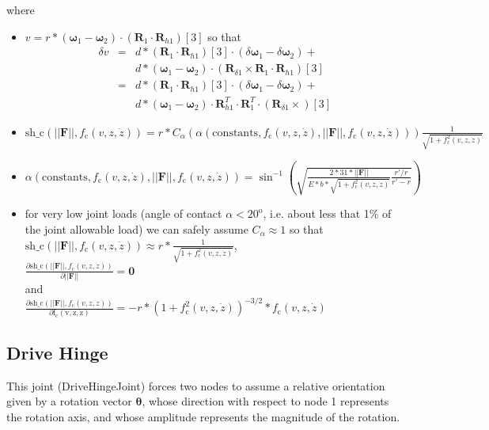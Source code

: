 \documentclass[10pt,dvips,fleqn]{report}
\newcommand{\T}[1]{\boldsymbol{#1}}
\begin{document}
where
\begin{itemize}
\item
$v=r * (\T \omega_{1}-\T \omega_{2})\cdot(\T R_1\cdot \T R_{h1})[3]$
so that
\begin{eqnarray*}
\delta v &=& d * (\T R_1\cdot \T R_{h1})[3] \cdot (\delta \T \omega_{1}- \delta \T \omega_{2}) +\\
	&& d * (\T \omega_{1}-\T \omega_{2})\cdot (\T R_{\delta 1} \times \T R_1 \cdot \T R_{h1})[3]\\
	&=& d * (\T R_1\cdot \T R_{h1})[3] \cdot (\delta \T \omega_{1}- \delta \T \omega_{2}) +\\
	&& d * (\T \omega_{1}-\T \omega_{2})\cdot \T R_{h1}^T \cdot \T R_1^T \cdot (\T R_{\delta 1} \times )[3]
\end{eqnarray*}
\item
$
\mathrm{sh\_c}(||\T F||, f_{\mathrm{c}}(v,z,\dot{z}))=
r * 
C_\alpha(
	\alpha(\mathrm{constants},
		f_{\mathrm{c}}(v,z,\dot{z}),
		||\T F||,
		f_{\mathrm{c}}(v,z,\dot{z})
	)
) 
\frac{\displaystyle 1}{\displaystyle \sqrt{1+f_{\mathrm{c}}^2(v,z,\dot{z})}}
$
\item
$
\alpha(\mathrm{constants},
	f_{\mathrm{c}}(v,z,\dot{z}),
	||\T F||,
	f_{\mathrm{c}}(v,z,\dot{z})
) =
\sin^{-1}\left(
	\sqrt{
		\frac{\displaystyle 2*31*||\T F||}
			{\displaystyle E*b*\sqrt{1+f_{\mathrm{c}}^2(v,z,\dot{z})}}
		\frac{\displaystyle r'/r}
			{\displaystyle r'-r}
	}
\right)
$
\item for very low joint loads (angle of contact $\alpha< 20^{\mathrm{o}}$,
i.e. about less that 1\% of the joint allowable load)
we can safely assume $C_\alpha\approx 1$
so that\\ 
$
\mathrm{sh\_c}(||\T F||, f_{\mathrm{c}}(v,z,\dot{z}))\approx
r * 
\frac{\displaystyle 1}{\displaystyle \sqrt{1+f_{\mathrm{c}}^2(v,z,\dot{z})}}
$,\\

$
\frac{\displaystyle\partial \mathrm{sh\_c}(||\T F||, f_{\mathrm{c}}(v,z,\dot{z}))}
	{\displaystyle \partial ||\T F||} = \T 0
$\\
and\\
$
\frac{\displaystyle\partial \mathrm{sh\_c}(||\T F||, f_{\mathrm{c}}(v,z,\dot{z}))}
	{\displaystyle\partial \mathrm{f_{\mathrm{c}}(v,z,\dot{z})}} =
	-r * (1+f_{\mathrm{c}}^2(v,z,\dot{z}))^{-3/2}*f_{\mathrm{c}}(v,z,\dot{z})
$
\end{itemize}




\subsection{Drive Hinge}
This joint (DriveHingeJoint) forces two nodes to assume a relative orientation
given by a rotation vector $\T{\theta}$, whose direction with respect
to node 1 represents the rotation axis, and whose amplitude represents 
the magnitude of the rotation.
\end{document}
